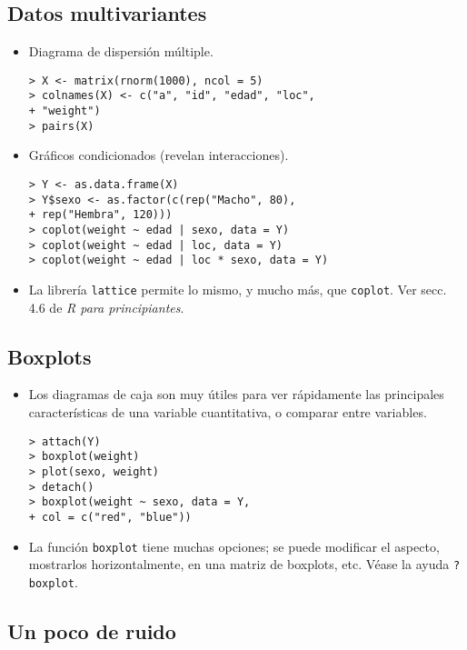 \newslide

\subsection{Datos multivariantes}

\begin{itemize}
\item Diagrama de dispersión múltiple.
\begin{verbatim}
> X <- matrix(rnorm(1000), ncol = 5)
> colnames(X) <- c("a", "id", "edad", "loc",
+ "weight")
> pairs(X)
\end{verbatim}
\item Gráficos condicionados (revelan interacciones).
\begin{verbatim}
> Y <- as.data.frame(X)
> Y$sexo <- as.factor(c(rep("Macho", 80),
+ rep("Hembra", 120)))
> coplot(weight ~ edad | sexo, data = Y)
> coplot(weight ~ edad | loc, data = Y)
> coplot(weight ~ edad | loc * sexo, data = Y)
\end{verbatim}
\item La librería \verb"lattice" permite lo mismo, y mucho más, que
\verb"coplot". Ver secc. 4.6 de \emph{R para principiantes}.
\end{itemize}

\newslide

\subsection{Boxplots}

\begin{itemize}
\item Los diagramas de caja son muy útiles para ver rápidamente
las principales características de una variable cuantitativa,
o comparar entre variables.
\begin{verbatim}
> attach(Y)
> boxplot(weight)
> plot(sexo, weight)
> detach()
> boxplot(weight ~ sexo, data = Y,
+ col = c("red", "blue"))
\end{verbatim}
\item La función \verb"boxplot" tiene muchas opciones;
se puede modificar el aspecto, mostrarlos horizontalmente,
en una matriz de boxplots, etc. Véase la ayuda \verb"?boxplot".
\end{itemize}

\newslide

\subsection{Un poco de ruido}

